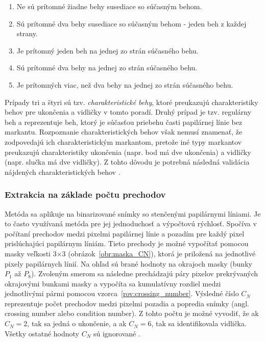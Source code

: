   \begin{enumerate}
    \item Ne sú prítomné žiadne behy susediace so súčasným behom.
    \item Sú prítomné dva behy susediace so súčasným behom - jeden beh z každej strany.
    \item Je prítomný jeden beh na jednej zo strán súčasného behu.
    \item Sú prítomné dva behy na jednej zo strán súčasného behu.
    \item Je prítomných viac, než dva behy na jednej zo strán súčasného behu.
  \end{enumerate}
  Prípady tri a štyri sú tzv. \emph{charakteristické behy}, ktoré preukazujú charakteristiky behov pre ukončenia a vidličky v tomto poradí. Druhý prípad je
  tzv. regulárny beh a reprezentuje beh, ktorý je súčasťou priebehu časti papilárnej línie bez markantu. Rozpoznanie charakteristických behov však
  nemusí znamenať, že zodpovedajú ich charakteristickým markantom, pretože iné typy markantov preukazujú charakteristiky ukončenia (napr. bod má dve ukončenia)
  a vidličky (napr. slučka má dve vidličky). Z tohto dôvodu je potrebná následná validácia nájdených charakteristických behov \cite{bansal2011minutiae}.

  \subsubsection*{Extrakcia na základe počtu prechodov} \label{sec:extrakcia_prechodmi}
  Metóda sa aplikuje na binarizované snímky so stenčenými papilárnymi líniami. Je to často využívaná metóda pre jej jednoduchosť a výpočtovú rýchlosť.
  Spočíva v počítaní prechodov medzi pixelmi papilárnej línie a pozadím pre každý pixel prislúchajúci papilárnym líniám. Tieto prechody je možné vypočítať
  pomocou masky veľkosti {$3$$\times{}$$3$} (obrázok~{\ref{obr:maska_CN}}), ktorá je priložená na jednotlivé pixely papilárnych línií. Na ohľad sú brané
  hodnoty na okrajoch masky (bunky $P_1$ až $P_8$). Zvoleným smerom sa následne prechádzajú páry pixelov prekrývaných okrajovými bunkami masky a vypočíta
  sa kumulatívny rozdiel medzi jednotlivými pármi pomocou vzorca~{\ref{rov:crossing_number}}. Výsledné číslo $C_N$ reprezentuje počet prechodov medzi
  pixelmi pozadia a popredia snímky (angl. crossing number alebo condition number). Z tohto počtu je možné vyvodiť, že ak $C_N = 2$, tak sa jedná o ukončenie,
  a ak $C_N = 6$, tak sa identifikovala vidlička. Všetky ostatné hodnoty $C_N$ sú ignorované \cite{amengual1997minutiae_extraction}.

